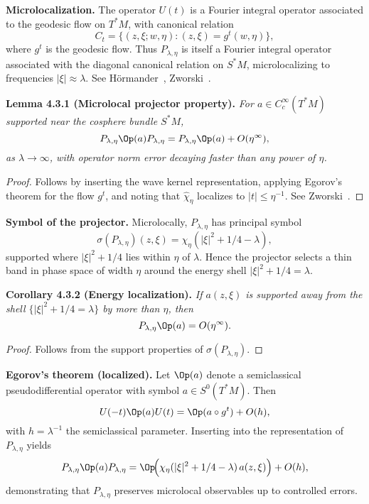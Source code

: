 \medskip

\noindent\textbf{Microlocalization.}
The operator $U(t)$ is a Fourier integral operator associated to the geodesic flow on $T^*M$,
with canonical relation
\[
  C_t = \{(z,\xi; w,\eta) : (z,\xi) = g^t(w,\eta)\},
\]
where $g^t$ is the geodesic flow.
Thus $P_{\lambda,\eta}$ is itself a Fourier integral operator
associated with the diagonal canonical relation on $S^*M$,
microlocalizing to frequencies $|\xi|\approx \lambda$.
See Hörmander~\cite{Hormander1994}, Zworski~\cite{Zworski2012}.

\medskip

\noindent\textbf{Lemma 4.3.1 (Microlocal projector property).}
\emph{For $a\in C_c^{\infty}(T^*M)$ supported near the cosphere bundle $S^*M$,
\[
  P_{\lambda,\eta} \Op(a) P_{\lambda,\eta} = P_{\lambda,\eta}\Op(a) + O(\eta^\infty),
\]
as $\lambda\to\infty$, with operator norm error decaying faster than any power of $\eta$.}

\begin{proof}
Follows by inserting the wave kernel representation,
applying Egorov’s theorem for the flow $g^t$,
and noting that $\widehat{\chi}_{\eta}$ localizes to $|t|\le \eta^{-1}$.
See Zworski~\cite[Chapter~10]{Zworski2012}.
\end{proof}

\medskip

\noindent\textbf{Symbol of the projector.}
Microlocally, $P_{\lambda,\eta}$ has principal symbol
\[
  \sigma(P_{\lambda,\eta})(z,\xi) = \chi_{\eta}(|\xi|^2+1/4 - \lambda),
\]
supported where $|\xi|^2+1/4$ lies within $\eta$ of $\lambda$.
Hence the projector selects a thin band in phase space of width $\eta$ around the energy shell $|\xi|^2+1/4=\lambda$.

\medskip

\noindent\textbf{Corollary 4.3.2 (Energy localization).}
\emph{If $a(z,\xi)$ is supported away from the shell $\{|\xi|^2+1/4=\lambda\}$ by more than $\eta$,
then
\[
  P_{\lambda,\eta}\Op(a) = O(\eta^\infty).
\]}

\begin{proof}
Follows from the support properties of $\sigma(P_{\lambda,\eta})$.
\end{proof}

\medskip

\noindent\textbf{Egorov’s theorem (localized).}
Let $\Op(a)$ denote a semiclassical pseudodifferential operator with symbol $a\in S^0(T^*M)$.
Then
\[
  U(-t) \Op(a) U(t) = \Op(a\circ g^t) + O(h),
\]
with $h=\lambda^{-1}$ the semiclassical parameter.
Inserting into the representation of $P_{\lambda,\eta}$ yields
\[
  P_{\lambda,\eta} \Op(a) P_{\lambda,\eta}
  = \Op\!\Big( \chi_{\eta}(|\xi|^2+1/4-\lambda)\, a(z,\xi)\Big) + O(h),
\]
demonstrating that $P_{\lambda,\eta}$ preserves microlocal observables up to controlled errors.

